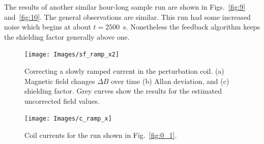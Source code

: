 

The results of another similar hour-long sample run are shown in
Figs.~\ref{fig:9} and~\ref{fig:10}.  The general observations are
similar.  This run had some increased noise which begins at about
$t=2500$~s.  Nonetheless the feedback algorithm keeps the shielding
factor generally above one.

\begin{figure}
\centering
\texttt{[image: Images/sf\_ramp\_x2]}
\caption[Correcting a slowly ramped current in the perturbation coil.]{Correcting a slowly ramped current in the perturbation coil.  (a)
 Magnetic field changes $\Delta B$ over time (b) Allan deviation, and
 (c) shielding factor.  Grey curves show the results for the estimated
 uncorrected field values.}  \label{fig:0_1}
        \texttt{[image: Images/c\_ramp\_x]}
        \caption{Coil currents for the run shown in Fig.~\ref{fig:0_1}.}
        \label{fig:0_2}
\end{figure}

